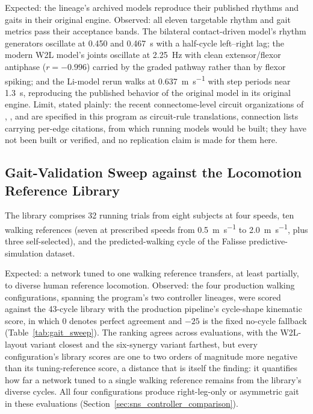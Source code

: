 Expected: the lineage's archived models reproduce their published rhythms and gaits in their original engine. Observed: all eleven targetable rhythm and gait metrics pass their acceptance bands. The bilateral contact-driven model's rhythm generators oscillate at \qty{0.450}{} and \qty{0.467}{\second} with a half-cycle left--right lag; the modern W2L model's joints oscillate at \qty{2.25}{\Hz} with clean extensor/flexor antiphase ($r = -0.996$) carried by the graded pathway rather than by flexor spiking; and the Li-model rerun \citep{li_bipedal_2017} walks at \qty{0.637}{\meter\per\second} with step periods near \qty{1.3}{\second}, reproducing the published behavior of the original model in its original engine. Limit, stated plainly: the recent connectome-level circuit organizations of \citet{shevtsova_modeling_2016}, \citet{dirusso_investigating_2023}, and \citet{shinohara_mechanisms_2025} are specified in this program as circuit-rule translations, connection lists carrying per-edge citations, from which running models would be built; they have not been built or verified, and no replication claim is made for them here.

\subsection{Gait-Validation Sweep against the Locomotion Reference Library}\label{sec:gait_library_results}

The library comprises 32 running trials from eight subjects at four speeds, ten walking references (seven at prescribed speeds from \qty{0.5}{\metre\per\second} to \qty{2.0}{\metre\per\second}, plus three self-selected), and the predicted-walking cycle of the Falisse predictive-simulation dataset.

Expected: a network tuned to one walking reference transfers, at least partially, to diverse human reference locomotion. Observed: the four production walking configurations, spanning the program's two controller lineages, were scored against the 43-cycle library with the production pipeline's cycle-shape kinematic score, in which 0 denotes perfect agreement and $-25$ is the fixed no-cycle fallback (Table~\ref{tab:gait_sweep}). The ranking agrees across evaluations, with the W2L-layout variant closest and the six-synergy variant farthest, but every configuration's library scores are one to two orders of magnitude more negative than its tuning-reference score, a distance that is itself the finding: it quantifies how far a network tuned to a single walking reference remains from the library's diverse cycles. All four configurations produce right-leg-only or asymmetric gait in these evaluations (Section~\ref{sec:sns_controller_comparison}).

